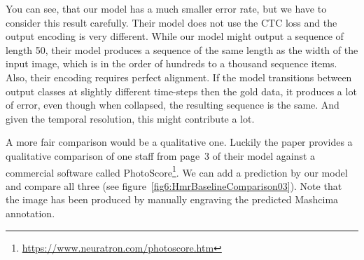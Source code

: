 You can see, that our model has a much smaller error rate, but we have to consider this result carefully. Their model does not use the CTC loss and the output encoding is very different. While our model might output a sequence of length 50, their model produces a sequence of the same length as the width of the input image, which is in the order of hundreds to a thousand sequence items. Also, their encoding requires perfect alignment. If the model transitions between output classes at slightly different time-steps then the gold data, it produces a lot of error, even though when collapsed, the resulting sequence is the same. And given the temporal resolution, this might contribute a lot.

A more fair comparison would be a qualitative one. Luckily the paper provides a qualitative comparison of one staff from page~3 of their model against a commercial software called PhotoScore\footnote{\href{https://www.neuratron.com/photoscore.htm}{https://www.neuratron.com/photoscore.htm}}. We can add a prediction by our model and compare all three (see figure~\ref{fig6:HmrBaselineComparison03}). Note that the image has been produced by manually engraving the predicted Mashcima annotation.

